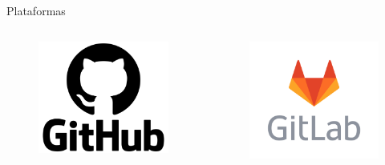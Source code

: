\documentclass{beamer}
\begin{document}
\begin{frame}{Plataformas} 
 \begin{columns}

  \begin{column}{0.3\linewidth}
    \begin{figure}
      \includegraphics[width=\textwidth]{images/logo_github.png}
    \end{figure}
  \end{column}
  
  \begin{column}{0.3\linewidth}
    \begin{figure}
      \includegraphics[width=1.2\textwidth]{images/logo_gitlab.png}
    \end{figure}
  \end{column}


\end{columns}
\end{frame}
\end{document}
